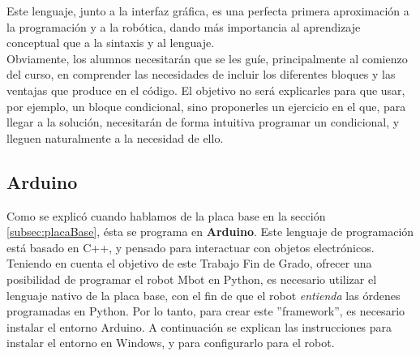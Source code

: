 \par Este lenguaje, junto a la interfaz gráfica, es una perfecta primera aproximación a la programación y a la robótica, dando más importancia al aprendizaje conceptual que a la sintaxis y al lenguaje. \\
Obviamente, los alumnos necesitarán que se les guíe, principalmente al comienzo del curso, en comprender las necesidades de incluir los diferentes bloques y las ventajas que produce en el código. El objetivo no será explicarles para que usar, por ejemplo, un bloque condicional,  sino proponerles un ejercicio en el que, para llegar a la solución, necesitarán de forma intuitiva programar un condicional, y lleguen naturalmente a la necesidad de ello.
\subsection{Arduino}\label{subsec:arduino}
Como se explicó cuando hablamos de la placa base en la sección \ref{subsec:placaBase}, ésta se programa en \textbf{Arduino}. Este lenguaje de programación está basado en C++, y pensado para interactuar con objetos electrónicos. \\
Teniendo en cuenta el objetivo de este Trabajo Fin de Grado, ofrecer una posibilidad de programar el robot Mbot en Python, es necesario utilizar el lenguaje nativo de la placa base, con el fin de que el robot \textit{entienda} las órdenes programadas en Python. Por lo tanto, para crear este ''framework'', es necesario instalar el entorno Arduino. A continuación se explican las instrucciones para instalar el entorno en Windows, y para configurarlo para el robot.
